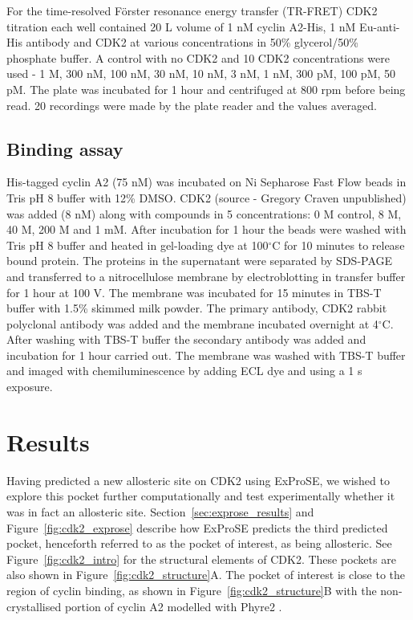For the time-resolved F\"{o}rster resonance energy transfer (TR-FRET) CDK2 titration each well contained 20 \textmu L volume of 1 nM cyclin A2-His, 1 nM Eu-anti-His antibody and CDK2 at various concentrations in 50\% glycerol/50\% phosphate buffer.
A control with no CDK2 and 10 CDK2 concentrations were used - 1 \textmu M, 300 nM, 100 nM, 30 nM, 10 nM, 3 nM, 1 nM, 300 pM, 100 pM, 50 pM.
The plate was incubated for 1 hour and centrifuged at 800 rpm before being read.
20 recordings were made by the plate reader and the values averaged.


\subsection{Binding assay}

His-tagged cyclin A2 (75 nM) was incubated on Ni Sepharose Fast Flow beads in Tris pH 8 buffer with 12\% DMSO.
CDK2 (source - Gregory Craven unpublished) was added (8 nM) along with compounds in 5 concentrations: 0 M control, 8 \textmu M, 40 \textmu M, 200 \textmu M and 1 mM.
After incubation for 1 hour the beads were washed with Tris pH 8 buffer and heated in gel-loading dye at 100$^{\circ}$C for 10 minutes to release bound protein.
The proteins in the supernatant were separated by SDS-PAGE and transferred to a nitrocellulose membrane by electroblotting in transfer buffer for 1 hour at 100 V.
The membrane was incubated for 15 minutes in TBS-T buffer with 1.5\% skimmed milk powder.
The primary antibody, CDK2 rabbit polyclonal antibody was added and the membrane incubated overnight at 4$^{\circ}$C.
After washing with TBS-T buffer the secondary antibody was added and incubation for 1 hour carried out.
The membrane was washed with TBS-T buffer and imaged with chemiluminescence by adding ECL dye and using a 1 s exposure.


\section{Results}
\label{sec:cdk2_results}

Having predicted a new allosteric site on CDK2 using ExProSE, we wished to explore this pocket further computationally and test experimentally whether it was in fact an allosteric site.
Section~\ref{sec:exprose_results} and Figure~\ref{fig:cdk2_exprose} describe how ExProSE predicts the third predicted pocket, henceforth referred to as the pocket of interest, as being allosteric.
See Figure~\ref{fig:cdk2_intro} for the structural elements of CDK2.
These pockets are also shown in Figure~\ref{fig:cdk2_structure}A.
The pocket of interest is close to the region of cyclin binding, as shown in Figure~\ref{fig:cdk2_structure}B with the non-crystallised portion of cyclin A2 modelled with Phyre2 \cite{Kelley2015}.


